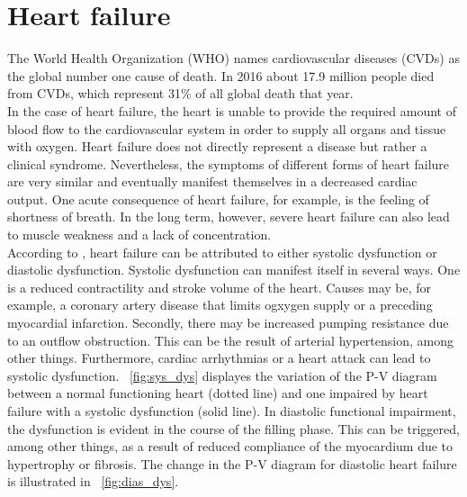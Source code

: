 \section{Heart failure}
The World Health Organization (WHO) names cardiovascular diseases (CVDs) as the global number one cause of death. In 2016 about 17.9 million people died from CVDs, which represent 31{\%} of all global death that year.\cite{WHO}
\\In the case of heart failure, the heart is unable to provide the required amount of blood flow to the cardiovascular system in order to supply all organs and tissue with oxygen.
Heart failure does not directly represent a disease but rather a clinical syndrome. Nevertheless, the symptoms of different forms of heart failure are very similar and eventually manifest themselves in a decreased cardiac output. One acute consequence of heart failure, for example, is the feeling of shortness of breath. In the long term, however, severe heart failure can also lead to muscle weakness and a lack of concentration.
\\According to \cite{HKS4}, heart failure can be attributed to either systolic dysfunction or diastolic dysfunction. Systolic dysfunction can manifest itself in several ways. One is a reduced contractility and stroke volume of the heart. Causes may be, for example, a coronary artery disease that limits ogxygen supply or a preceding myocardial infarction. Secondly, there may be increased pumping resistance due to an outflow obstruction.  This can be the result of arterial hypertension, among other things. Furthermore, cardiac arrhythmias or a heart attack can lead to systolic dysfunction. \figurename~\ref{fig:sys_dys} displayes the variation of the P-V diagram between a normal functioning heart (dotted line) and one impaired by heart failure with a systolic dysfunction (solid line). In diastolic functional impairment, the dysfunction is evident in the course of the filling phase. This can be triggered, among other things, as a result of reduced compliance of the myocardium due to hypertrophy or fibrosis. The change in the P-V diagram for diastolic heart failure is illustrated in \figurename~\ref{fig:dias_dys}.
